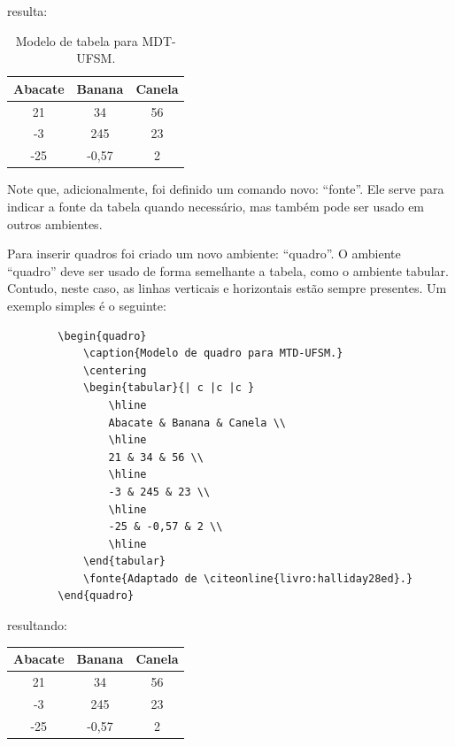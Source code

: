 	\noindent resulta:
	
	\begin{table}[ht]
		\centering
		\caption{Modelo de tabela para MDT-UFSM.}
		\begin{tabular}{ c c c }
			\hline
			Abacate & Banana & Canela \\
			\hline
			21 & 34 & 56 \\
			-3 & 245 & 23 \\
			-25 & -0,57 & 2 \\
			\hline
		\end{tabular}
	\end{table}
	
	\par Note que, adicionalmente, foi definido um comando novo: ``fonte''. Ele serve para indicar a fonte da tabela quando necessário, mas também pode ser usado em outros ambientes.
	
	\par Para inserir quadros foi criado um novo ambiente: ``quadro''. O ambiente ``quadro'' deve ser usado de forma semelhante a tabela, como o ambiente tabular. Contudo, neste caso, as linhas verticais e horizontais estão sempre presentes. Um exemplo simples é o seguinte: 
	
	
	\begin{verbatim}
		\begin{quadro}
			\caption{Modelo de quadro para MTD-UFSM.}
			\centering
			\begin{tabular}{| c |c |c }
				\hline
				Abacate & Banana & Canela \\
				\hline
				21 & 34 & 56 \\
				\hline
				-3 & 245 & 23 \\
				\hline
				-25 & -0,57 & 2 \\
				\hline
			\end{tabular}
			\fonte{Adaptado de \citeonline{livro:halliday28ed}.}
		\end{quadro}
	\end{verbatim}
	
	\noindent resultando:
	
	\begin{quadro}
		\caption{Modelo de quadro para MTD-UFSM.}
		\centering
		\begin{tabular}{| c |c |c |}
			\hline
			Abacate & Banana & Canela \\
			\hline
			21 & 34 & 56 \\
			\hline
			-3 & 245 & 23 \\
			\hline
			-25 & -0,57 & 2 \\
			\hline
		\end{tabular}
	\end{quadro}
	
